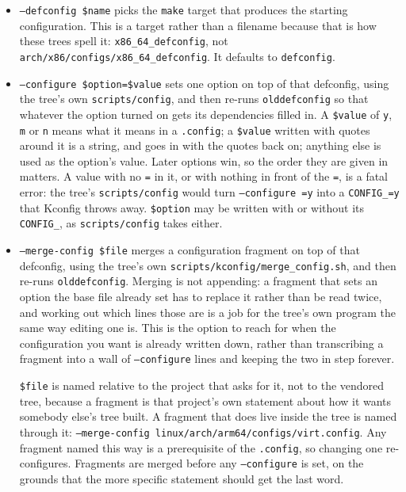 \documentclass{article}
\begin{document}
\begin{itemize}
\item \texttt{--defconfig \$name} picks the \texttt{make} target that
  produces the starting configuration.  This is a target rather than
  a filename because that is how these trees spell it:
  \texttt{x86\_64\_defconfig}, not
  \texttt{arch/x86/configs/x86\_64\_defconfig}.  It defaults to
  \texttt{defconfig}.

\item \texttt{--configure \$option=\$value} sets one option on top of
  that defconfig, using the tree's own \texttt{scripts/config}, and
  then re-runs \texttt{olddefconfig} so that whatever the option
  turned on gets its dependencies filled in.  A \texttt{\$value} of
  \texttt{y}, \texttt{m} or \texttt{n} means what it means in a
  \texttt{.config}; a \texttt{\$value} written with quotes around it
  is a string, and goes in with the quotes back on; anything else is
  used as the option's value.  Later options win, so the order they
  are given in matters.  A value with no \texttt{=} in it, or with
  nothing in front of the \texttt{=}, is a fatal error: the tree's
  \texttt{scripts/config} would turn \texttt{--configure =y} into a
  \texttt{CONFIG\_=y} that Kconfig throws away.  \texttt{\$option}
  may be written with or without its \texttt{CONFIG\_}, as
  \texttt{scripts/config} takes either.

\item \texttt{--merge-config \$file} merges a configuration fragment
  on top of that defconfig, using the tree's own
  \texttt{scripts/kconfig/merge\_config.sh}, and then re-runs
  \texttt{olddefconfig}.  Merging is not appending: a fragment that
  sets an option the base file already set has to replace it rather
  than be read twice, and working out which lines those are is a job
  for the tree's own program the same way editing one is.  This is
  the option to reach for when the configuration you want is already
  written down, rather than transcribing a fragment into a wall of
  \texttt{--configure} lines and keeping the two in step forever.

  \texttt{\$file} is named relative to the project that asks for it,
  not to the vendored tree, because a fragment is that project's own
  statement about how it wants somebody else's tree built.  A
  fragment that does live inside the tree is named through it:
  \texttt{--merge-config linux/arch/arm64/configs/virt.config}.  Any
  fragment named this way is a prerequisite of the
  \texttt{.config}, so changing one re-configures.  Fragments are
  merged before any \texttt{--configure} is set, on the grounds that
  the more specific statement should get the last word.


\end{itemize}
\end{document}
